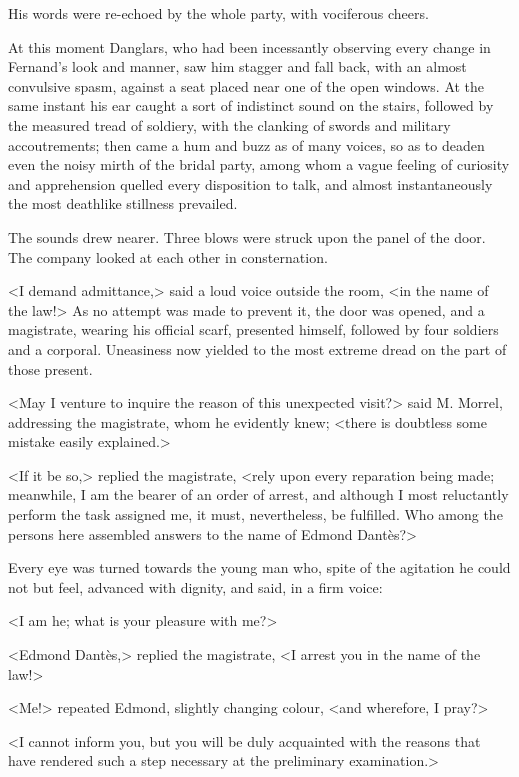  His words were re-echoed by the whole party, with vociferous cheers. 

 At this moment Danglars, who had been incessantly observing every change in Fernand's look and manner, saw him stagger and fall back, with an almost convulsive spasm, against a seat placed near one of the open windows. At the same instant his ear caught a sort of indistinct sound on the stairs, followed by the measured tread of soldiery, with the clanking of swords and military accoutrements; then came a hum and buzz as of many voices, so as to deaden even the noisy mirth of the bridal party, among whom a vague feeling of curiosity and apprehension quelled every disposition to talk, and almost instantaneously the most deathlike stillness prevailed. 

 The sounds drew nearer. Three blows were struck upon the panel of the door. The company looked at each other in consternation. 

 <I demand admittance,> said a loud voice outside the room, <in the name of the law!> As no attempt was made to prevent it, the door was opened, and a magistrate, wearing his official scarf, presented himself, followed by four soldiers and a corporal. Uneasiness now yielded to the most extreme dread on the part of those present. 

 <May I venture to inquire the reason of this unexpected visit?> said M. Morrel, addressing the magistrate, whom he evidently knew; <there is doubtless some mistake easily explained.> 

 <If it be so,> replied the magistrate, <rely upon every reparation being made; meanwhile, I am the bearer of an order of arrest, and although I most reluctantly perform the task assigned me, it must, nevertheless, be fulfilled. Who among the persons here assembled answers to the name of Edmond Dantès?> 

 Every eye was turned towards the young man who, spite of the agitation he could not but feel, advanced with dignity, and said, in a firm voice: 

 <I am he; what is your pleasure with me?> 

 <Edmond Dantès,> replied the magistrate, <I arrest you in the name of the law!> 

 <Me!> repeated Edmond, slightly changing colour, <and wherefore, I pray?> 

 <I cannot inform you, but you will be duly acquainted with the reasons that have rendered such a step necessary at the preliminary examination.> 

